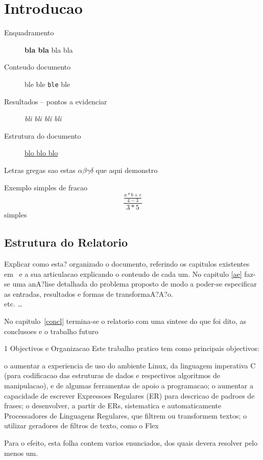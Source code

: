 \chapter*{Introducao} \label{intro}

\begin{description}
  \item [Enquadramento] \textbf{bla bla} bla bla
  \item [Conteudo documento] \textsf{ble ble} \texttt{ble} ble
  \item [Resultados -- pontos a evidenciar] \textit{bli bli bli bli}
  \item [Estrutura do documento] \underline{blo blo blo}
\end{description}

Letras gregas sao estas $ \alpha \beta \gamma \delta $ que aqui demonstro

Exemplo simples de fracao \[ \frac{\frac{a * b + c}{4-3}}{3*5} \] simples

\section*{Estrutura do Relatorio} 


Explicar como esta? organizado o documento, referindo os capitulos existentes
em~\cite{yu09} e a sua articulacao explicando o conteudo de cada um.  No
capitulo \ref{ae} faz-se uma anA?lise detalhada do problema proposto de modo
a poder-se especificar  as entradas, resultados e formas de transformaA?A?o.\\
etc. \ldots


No capitulo~\ref{concl} termina-se o relatorio com uma sintese do que foi dito,
as conclusoes e o trabalho futuro

1     Objectivos e Organizacao
Este trabalho pratico tem como principais objectivos:

    o aumentar a experiencia de uso do ambiente Linux, da linguagem imperativa C (para codificacao das estruturas
      de dados e respectivos algoritmos de manipulacao), e de algumas ferramentas de apoio a programacao;
    o aumentar a capacidade de escrever Expressoes Regulares (ER) para descricao de padroes de frases;
    o desenvolver, a partir de ERs, sistematica e automaticamente Processadores de Linguagens Regulares, que filtrem
      ou transformem textos;
    o utilizar geradores de filtros de texto, como o Flex

Para o efeito, esta folha contem varios enunciados, dos quais devera resolver pelo menos um.


